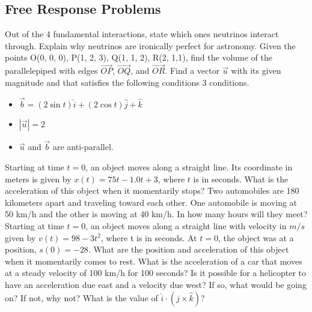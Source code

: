 \documentclass[12pt,addpoints]{exam}
\begin{document}
{{{\begin{questions}
					\subsection*{Free Response Problems}
					\question[1] Out of the 4 fundamental interactions, state which ones neutrinos interact through. Explain why neutrinos are ironically perfect for astronomy. \vspace{1.5in}
					\question[1] Given the points O(0, 0, 0), P(1, 2, 3), Q(1, 1, 2), R(2, 1,1), find the volume of the parallelepiped with edges $\overrightarrow{OP}$, $\overrightarrow{OQ}$, and $\overrightarrow{OR}$.\vspace{1.5in}
					\question[1] Find a vector $\vec{u}$ with its given magnitude and that satisfies the following conditions 3 conditions.
					\begin{itemize}
						\item $\vec b=(2\sin t)\hat{i}+(2\cos t)\hat{j}+\hat{k}$
						\item $|\vec u|=2$ 
						\item $\vec{u}$ and $\vec{b}$ are anti-parallel.
					\end{itemize}
					\vspace{1.4in}
					\question[1] Starting at time $t = 0$, an object moves along a straight line. Its coordinate in meters is given by $x(t) = 75t-1.0t+3$, where $t$ is in seconds. What is the acceleration of this object when it momentarily stops?\vspace{1.5in}
					\question[1] Two automobiles are 180 kilometers apart and traveling toward each other. One automobile is moving at 50 km/h and the other is moving at 40 km/h. In how many hours will they meet?\vspace{2.5in}
					\question[2] Starting at time $t = 0$, an object moves along a straight line with velocity in $m/s$ given by $v(t) = 98-3t^2$, where t is in seconds. At $t=0$, the object was at a position, $s(0)=-28$. What are the position and acceleration of this object when it momentarily comes to rest.\vspace{1.5in}
					\question[1] What is the acceleration of a car that moves at a steady velocity of 100 km/h for 100 seconds?\vspace{1in}
					\question[1] Is it possible for a helicopter to have an acceleration due east and a velocity due west? If so, what would be going on? If not, why not?\vspace{1in}
					\question[1] What is the value of $\hat{i}\cdot(\hat{j}\times\hat{k})$?\vspace{1.3in}
					\end{questions}
					\begin{center}

\end{center}}}}
\end{document}
